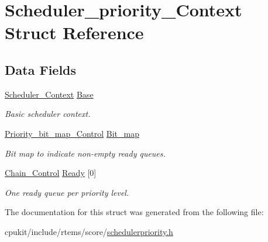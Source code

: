 \hypertarget{structScheduler__priority__Context}{}\section{Scheduler\+\_\+priority\+\_\+\+Context Struct Reference}
\label{structScheduler__priority__Context}
\subsection*{Data Fields}
\begin{DoxyCompactItemize}
\item 
\mbox{\label{structScheduler__priority__Context_a979bde169a39140c6225e844efd617ce}} 
\mbox{\hyperlink{structScheduler__Context}{Scheduler\+\_\+\+Context}} \mbox{\hyperlink{structScheduler__priority__Context_a979bde169a39140c6225e844efd617ce}{Base}}
\begin{DoxyCompactList}\small\item\em Basic scheduler context. \end{DoxyCompactList}\item 
\mbox{\label{structScheduler__priority__Context_a0e92fd75091268ace833a55603d00bae}} 
\mbox{\hyperlink{structPriority__bit__map__Control}{Priority\+\_\+bit\+\_\+map\+\_\+\+Control}} \mbox{\hyperlink{structScheduler__priority__Context_a0e92fd75091268ace833a55603d00bae}{Bit\+\_\+map}}
\begin{DoxyCompactList}\small\item\em Bit map to indicate non-\/empty ready queues. \end{DoxyCompactList}\item 
\mbox{\label{structScheduler__priority__Context_a9a98a25e1596d5f3888b34e1feab201e}} 
\mbox{\hyperlink{unionChain__Control}{Chain\+\_\+\+Control}} \mbox{\hyperlink{structScheduler__priority__Context_a9a98a25e1596d5f3888b34e1feab201e}{Ready}} \mbox{[}0\mbox{]}
\begin{DoxyCompactList}\small\item\em One ready queue per priority level. \end{DoxyCompactList}\end{DoxyCompactItemize}


The documentation for this struct was generated from the following file\+:\begin{DoxyCompactItemize}
\item 
cpukit/include/rtems/score/\mbox{\hyperlink{schedulerpriority_8h}{schedulerpriority.\+h}}\end{DoxyCompactItemize}
